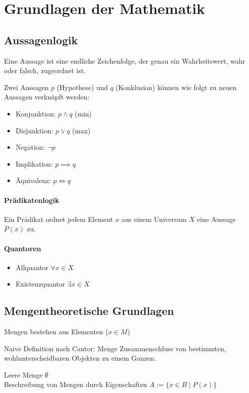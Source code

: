 
\section{Grundlagen der Mathematik}
\subsection{Aussagenlogik}
\begin{definition}
	Eine Aussage ist eine endliche Zeichenfolge, der genau ein Wahrheitswert, wahr oder falsch, zugeordnet ist.
\end{definition}

Zwei Aussagen $p$ (Hypothese) und $q$ (Konklusion) können wie folgt zu neuen
Aussagen verknüpft werden:
\begin{itemize}
	\item Konjunktion: $p \land q$ (min)
	\item Disjunktion: $p \lor q$ (max)
	\item Negation: $\neg p$
	\item Implikation: $p \implies q$
	\item Äquivalenz: $p \iff q$
\end{itemize}
\paragraph{Prädikatenlogik}
Ein Prädikat ordnet jedem Element $x$ aus einem Universum $X$ eine Aussage
$P(x)$ zu. 
\paragraph{Quantoren}
\begin{itemize}
	\item Allquantor $\forall x \in X$
	\item Existenzquantor $\exists x \in X$
\end{itemize}

\subsection{Mengentheoretische Grundlagen}
Mengen bestehen aus Elementen ($x \in M$)
\begin{definition*}
	Naive Definition nach Cantor: Menge Zusammenschluss von bestimmten, wohlunterscheidbaren Objekten zu einem Ganzen.
\end{definition*}
Leere Menge $\emptyset$\\
Beschreibung von Mengen durch Eigenschaften $A:=\{x \in B\mid P(x)\}$

